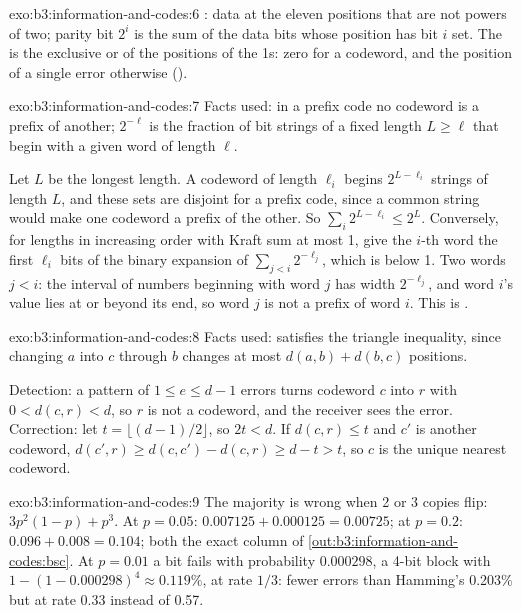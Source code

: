 \begin{solution}{exo:b3:information-and-codes:6}
: data at the eleven positions that are not powers of two; parity bit $2^i$ is the sum of the data bits whose position has bit $i$ set. The  is the exclusive or of the positions of the 1s: zero for a codeword, and the position of a single error otherwise ().
\end{solution}

\begin{solution}{exo:b3:information-and-codes:7}
Facts used: in a prefix code no codeword is a prefix of another; $2^{-\ell}$ is the fraction of bit strings of a fixed length $L \ge \ell$ that begin with a given word of length $\ell$.

Let $L$ be the longest length. A codeword of length $\ell_i$ begins $2^{L - \ell_i}$ strings of length $L$, and these sets are disjoint for a prefix code, since a common string would make one codeword a prefix of the other. So $\sum_i 2^{L - \ell_i} \le 2^L$. Conversely, for lengths in increasing order with Kraft sum at most 1, give the $i$-th word the first $\ell_i$ bits of the binary expansion of $\sum_{j < i} 2^{-\ell_j}$, which is below 1. Two words $j < i$: the interval of numbers beginning with word $j$ has width $2^{-\ell_j}$, and word $i$'s value lies at or beyond its end, so word $j$ is not a prefix of word $i$. This is .
\end{solution}

\begin{solution}{exo:b3:information-and-codes:8}
Facts used:  satisfies the triangle inequality, since changing $a$ into $c$ through $b$ changes at most $d(a, b) + d(b, c)$ positions.

Detection: a pattern of $1 \le e \le d - 1$ errors turns codeword $c$ into $r$ with $0 < d(c, r) < d$, so $r$ is not a codeword, and the receiver sees the error. Correction: let $t = \lfloor (d - 1)/2 \rfloor$, so $2t < d$. If $d(c, r) \le t$ and $c'$ is another codeword, $d(c', r) \ge d(c, c') - d(c, r) \ge d - t > t$, so $c$ is the unique nearest codeword.
\end{solution}

\begin{solution}{exo:b3:information-and-codes:9}
The majority is wrong when 2 or 3 copies flip: $3p^2(1 - p) + p^3$. At $p = 0.05$: $0.007125 + 0.000125 = 0.00725$; at $p = 0.2$: $0.096 + 0.008 = 0.104$; both the exact column of \cref{out:b3:information-and-codes:bsc}. At $p = 0.01$ a bit fails with probability $0.000298$, a 4-bit block with $1 - (1 - 0.000298)^4 \approx 0.119\%$, at rate $1/3$: fewer errors than Hamming's 0.203\% but at rate 0.33 instead of 0.57.
\end{solution}

